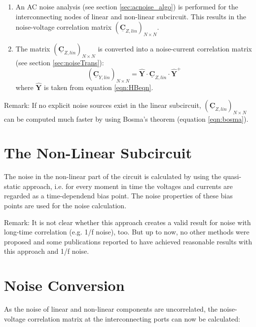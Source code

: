 \begin{enumerate}
\item An AC noise analysis (see section \ref{sec:acnoise_algo}) is
   performed for the interconnecting nodes of linear and non-linear
   subcircuit. This results in the noise-voltage correlation matrix
   $(\boldsymbol{\underline{C}}_{Z,lin})_{N\times N}$.
\item The matrix $(\boldsymbol{\underline{C}}_{Z,lin})_{N\times N}$
   is converted into a noise-current correlation matrix (see section
   \ref{sec:noiseTrans}):
   \begin{equation}
     (\boldsymbol{\underline{C}}_{Y,lin})_{N\times N} =
     \boldsymbol{\hat{Y}} \cdot
     \boldsymbol{\underline{C}}_{Z,lin} \cdot
     \boldsymbol{\hat{Y}}^+
   \end{equation}
   where $\boldsymbol{\hat{Y}}$ is taken from equation \ref{eqn:HBeqn}.
\end{enumerate}

Remark: If no explicit noise sources exist in the linear subcircuit,
$(\boldsymbol{\underline{C}}_{Z,lin})_{N\times N}$ can be computed
much faster by using Bosma's theorem (equation \ref{eqn:bosma}).


\section{The Non-Linear Subcircuit}

The noise in the non-linear part of the circuit is calculated
by using the quasi-static approach, i.e. for every moment in
time the voltages and currents are regarded as a time-dependend
bias point. The noise properties of these bias points are
used for the noise calculation.

\addvspace{12pt}

Remark: It is not clear whether this approach creates a valid result
for noise with long-time correlation (e.g. 1/f noise), too. But up
to now, no other methods were proposed and some publications
reported to have achieved reasonable results with this approach
and 1/f noise.


\section{Noise Conversion}

As the noise of linear and non-linear components are uncorrelated,
the noise-voltage correlation matrix at the interconnecting ports
can now be calculated:

